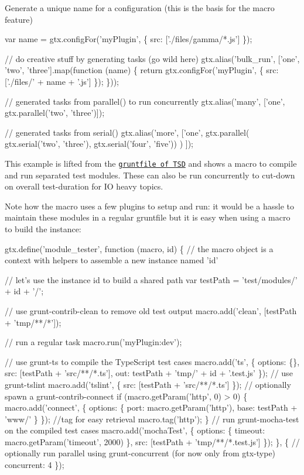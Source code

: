 Generate a unique name for a configuration (this is the basis for the macro feature) 
\begin{DoxyCode}
var name = gtx.configFor('myPlugin', \{
    src: ['./files/gamma/*.js']
\});

// do creative stuff by generating tasks (go wild here)
gtx.alias('bulk\_run', ['one', 'two', 'three'].map(function (name) \{
    return gtx.configFor('myPlugin', \{
        src: ['./files/' + name + '.js']
    \});
\}));

// generated tasks from parallel() to run concurrently
gtx.alias('many', ['one', gtx.parallel('two', 'three')]);

// generated tasks from serial()
gtx.alias('more', ['one', 
    gtx.parallel(
        gtx.serial('two', 'three'),
        gtx.serial('four', 'five'))
    )
]);
\end{DoxyCode}


This example is lifted from the \href{https://github.com/DefinitelyTyped/tsd/blob/develop-0.5.x/Gruntfile.js}{\tt gruntfile of T\+SD} and shows a macro to compile and run separated \textquotesingle{}test modules\textquotesingle{}. These can also be run concurrently to cut-\/down on overall test-\/duration for IO heavy topics.

Note how the macro uses a few plugins to setup and run\+: it would be a hassle to maintain these modules in a regular gruntfile but it is easy when using a macro to build the instance\+:


\begin{DoxyCode}
gtx.define('module\_tester', function (macro, id) \{
    // the macro object is a context with helpers to assemble a new instance named 'id'

    // let's use the instance id to build a shared path
    var testPath = 'test/modules/' + id + '/';

    // use grunt-contrib-clean to remove old test output
    macro.add('clean', [testPath + 'tmp/**/*']);

    // run a regular task
    macro.run('myPlugin:dev');

    // use grunt-ts to compile the TypeScript test cases
    macro.add('ts', \{
        options: \{\},
        src: [testPath + 'src/**/*.ts'],
        out: testPath + 'tmp/' + id + '.test.js'
    \});
    // use grunt-tslint
    macro.add('tslint', \{
        src: [testPath + 'src/**/*.ts']
    \});
    // optionally spawn a grunt-contrib-connect
    if (macro.getParam('http', 0) > 0) \{
        macro.add('connect', \{
            options: \{
                port: macro.getParam('http'),
                base: testPath + 'www/'
            \}
        \});
        //tag for easy retrieval
        macro.tag('http');
    \}
    // run grunt-mocha-test on the compiled test cases
    macro.add('mochaTest', \{
        options: \{
            timeout: macro.getParam('timeout', 2000)
        \},
        src: [testPath + 'tmp/**/*.test.js']
    \});
\}, \{
    // optionally run parallel using grunt-concurrent (for now only from gtx-type)
    concurrent: 4
\});
\end{DoxyCode}


